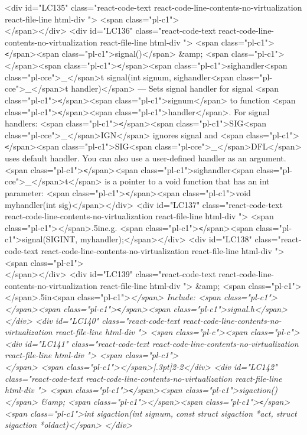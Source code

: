 {{{{{<div id="LC135" class="react-code-text react-code-line-contents-no-virtualization react-file-line html-div ">        <span class="pl-c1">\\</span></div>
<div id="LC136" class="react-code-text react-code-line-contents-no-virtualization react-file-line html-div ">    <span class="pl-c1">\texttt</span>{<span class="pl-c1">signal()</span>} &amp; <span class="pl-c1">\indenth</span><span class="pl-c1">\texttt</span>{<span class="pl-c1">sighandler<span class="pl-cce">\_</span>t signal(int signum, sighandler<span class="pl-cce">\_</span>t handler)</span>} --- Sets signal handler for signal <span class="pl-c1">\texttt</span>{<span class="pl-c1">signum</span>} to function <span class="pl-c1">\texttt</span>{<span class="pl-c1">handler</span>}.  For signal handlers: <span class="pl-c1">\texttt</span>{<span class="pl-c1">SIG<span class="pl-cce">\_</span>IGN</span>} ignores signal and <span class="pl-c1">\texttt</span>{<span class="pl-c1">SIG<span class="pl-cce">\_</span>DFL</span>} uses default handler. You can also use a user-defined handler as an argument. <span class="pl-c1">\texttt</span>{<span class="pl-c1">sighandler<span class="pl-cce">\_</span>t</span>} is a pointer to a void function that has an int parameter: <span class="pl-c1">\texttt</span>{<span class="pl-c1">void myhandler(int sig)</span>}</div>
<div id="LC137" class="react-code-text react-code-line-contents-no-virtualization react-file-line html-div ">    <span class="pl-c1">\newline\hspace</span>{.5in}e.g. <span class="pl-c1">\texttt</span>{<span class="pl-c1">signal(SIGINT, myhandler);</span>}</div>
<div id="LC138" class="react-code-text react-code-line-contents-no-virtualization react-file-line html-div ">        <span class="pl-c1">\\</span></div>
<div id="LC139" class="react-code-text react-code-line-contents-no-virtualization react-file-line html-div ">    &amp; <span class="pl-c1">\hspace</span>{.5in}<span class="pl-c1">\it</span> Include: <span class="pl-c1">\rm</span><span class="pl-c1">\texttt</span>{<span class="pl-c1">signal.h</span>}</div>
<div id="LC140" class="react-code-text react-code-line-contents-no-virtualization react-file-line html-div ">        <span class="pl-c"><span class="pl-c">%
<div id="LC141" class="react-code-text react-code-line-contents-no-virtualization react-file-line html-div ">        <span class="pl-c1">\\</span> <span class="pl-c1">\tabucline</span>[.3pt]{2-2}</div>
<div id="LC142" class="react-code-text react-code-line-contents-no-virtualization react-file-line html-div ">    <span class="pl-c1">\texttt</span>{<span class="pl-c1">sigaction()</span>} &amp; <span class="pl-c1">\indenth</span><span class="pl-c1">\texttt</span>{<span class="pl-c1">int sigaction(int signum, const struct sigaction *act, struct sigaction *oldact)</span>} </div>
}}}}}
